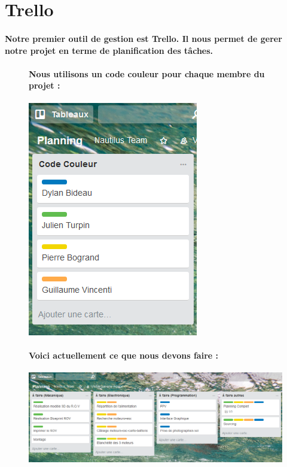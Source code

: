 \documentclass[a4paper,11pt]{report}
\begin{document}
        \section{Trello}
					\paragraph{Notre premier outil de gestion est Trello. Il nous permet de gerer notre projet en terme de planification des tâches. \newline}
						\begin{figure}[!h]
							\paragraph{Nous utilisons un code couleur pour chaque membre du projet : \newline}
							\begin{center}
								\includegraphics[scale=0.5]{Illustrations/Couleur.png}
							\end{center}
						\end{figure}
						\begin{figure}[!h]
							\paragraph{\newline Voici actuellement ce que nous devons faire : \newline}
							\begin{center}
								\includegraphics[scale=0.5]{Illustrations/Planning1.png}
							\end{center}
						\end{figure}
\end{document}
